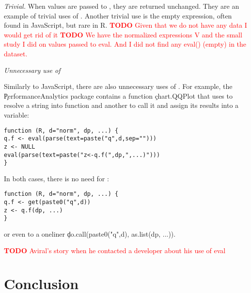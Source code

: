 \documentclass[screen,acmsmall]{acmart}
\newcommand{\mypara}[1]{\medskip\noindent\emph{#1}\xspace}
\newcommand{\authorcomment}[3]{\xspace\textcolor{#1}{{\bf #2} #3}\xspace}
\newcommand{\todo}[1]{\authorcomment{red}{TODO}{#1}}
\begin{document}
\mypara{Trivial.} When values are passed to \eval, they are returned
unchanged. They are an example of trivial uses of \eval. Another
trivial use is the empty expression, often found in JavaScript, but
rare in R. \todo{Given that we do not have any data I would get rid of it}
\todo{We have the normalized expressions V and the small study I did on values passed to eval. And I did not find any eval() (empty) in the dataset. }


\mypara{Unnecessary use of \eval}

Similarly to JavaScript, there are also unnecessary uses of \eval. For example,
the \c{PerformanceAnalytics} package contains a function \c{chart.QQPlot} that
uses \eval to resolve a string into function and another to call it and assign
its results into a variable:
\begin{lstlisting}
function (R, d="norm", dp, ...) {
q.f <- eval(parse(text=paste("q",d,sep="")))
z <- NULL
eval(parse(text=paste("z<-q.f(",dp,",...)")))
}
\end{lstlisting}
  In both cases, there is no need for \eval:
\begin{lstlisting}
function (R, d="norm", dp, ...) {
q.f <- get(paste0("q",d))
z <- q.f(dp, ...)
}
\end{lstlisting}
or even to a oneliner \c{do.call(paste0("q",d), as.list(dp, ...))}.

\todo{Aviral's story when he contacted a developer about his use of eval}

\section{Conclusion}


\end{document}
